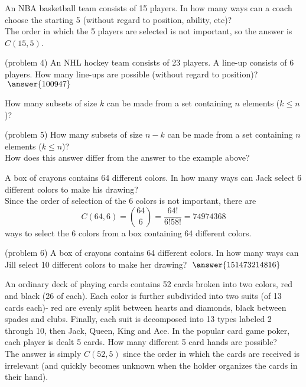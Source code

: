 \documentclass[handout]{ximera}
\begin{document}
\begin{example}[example 4]
An NBA basketball team consists of 15 players.  In how many ways can a coach choose the 
starting 5 (without regard to position, ability, etc)?\\
The order in which the 5 players are selected is not important, so the answer is $C(15, 5)$.
\end{example}

\begin{problem}(problem 4)
An NHL hockey team consists of 23 players.  A line-up consists of 6 players.  
How many line-ups are possible (without regard to position)? $\; \answer{100947}$\\

\end{problem}


\begin{example}[example 5]
How many subsets of size $k$ can be made from a set containing $n$ elements ($k\leq n$)?\\
\end{example}


\begin{problem}(problem 5)
How many subsets of size $n-k$ can be made from a set containing $n$ elements ($k\leq n$)?\\
How does this answer differ from the answer to the example above?\\
\end{problem}


\begin{example}[example 6]
A box of crayons contains 64 different colors.  In how many ways can Jack select
 6 different colors to make his drawing?\\
 Since the order of selection of the 6 colors is not important, there are 
 \[
 C(64, 6) = \binom{64}{6} = \frac{64!}{6!58!}=74974368
 \]
 ways to select the 6 colors from a box containing 64 different colors.
 
\end{example}


\begin{problem}(problem 6)
A box of crayons contains 64 different colors.  In how many ways can Jill select
 10 different colors to make her drawing? $\; \answer{151473214816}$\\
\end{problem}



\begin{example}[example 7] 
An ordinary deck of playing cards contains 52 cards broken into two colors, red and black (26 of each).  
Each color is further subdivided into two suits (of 13 cards each)- red are evenly split between 
hearts and diamonds, black between spades and clubs. 
Finally, each suit is decomposed into 13 types labeled 2 through 10, then Jack, Queen, King and Ace.
In the popular card game poker, each player is dealt 5 cards.  How many different 5 card hands are possible?\\
The answer is simply $C(52, 5)$ since the order in which the cards are received is 
irrelevant (and quickly becomes unknown when the holder organizes the cards in their hand).
\end{example}
\end{document}
